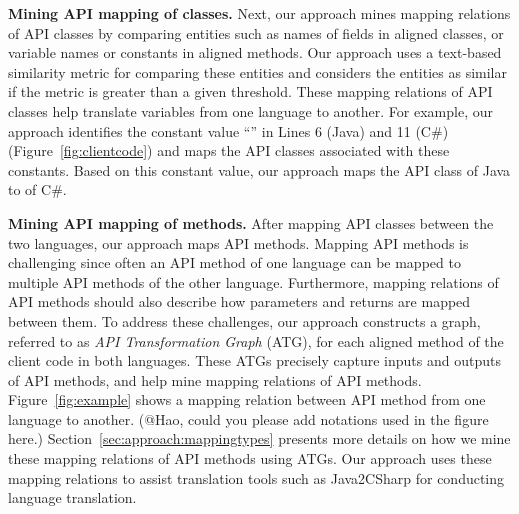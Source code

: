 \textbf{Mining API mapping of classes.} Next, our approach
mines mapping relations of API classes by comparing entities such as
names of fields in aligned classes, or variable names or constants
in aligned methods. Our approach uses a text-based similarity
metric for comparing these entities and considers the entities as
similar if the metric is greater than a given threshold. These
mapping relations of API classes help translate variables from one
language to another. For example, our approach identifies the
constant value ``'' in Lines 6 (Java) and 11 (C\#)
(Figure~\ref{fig:clientcode}) and maps the API classes associated
with these constants. Based on this constant value, our approach maps
the API class  of Java to  of C\#.

\textbf{Mining API mapping of methods.} After mapping API classes
between the two languages, our approach maps API methods. Mapping
API methods is challenging since often an API method of one language
can be mapped to multiple API methods of the other language.
Furthermore, mapping relations of API methods should also describe
how parameters and returns are mapped between them. To address
these challenges, our approach constructs a graph, referred to as
\emph{API Transformation Graph} (ATG), for each aligned method of the
client code in both languages. These ATGs precisely capture inputs
and outputs of API methods, and help mine mapping relations of API
methods. Figure~\ref{fig:example} shows a mapping relation between
API method  from one language to another. (@Hao, could you please
add notations used in the figure here.)
Section~\ref{sec:approach:mappingtypes} presents more details on how
we mine these mapping relations of API methods using ATGs.
Our approach uses these mapping relations to assist translation tools such
as Java2CSharp for conducting language translation.

